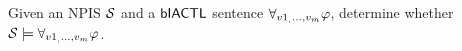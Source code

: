 \begin{definition}
  Given an NPIS $\mathcal{S}$ and a $\sf{bIACTL}$ sentence $\forall_{v1_,\ldots,v_m} \varphi$, determine whether
  $\mathcal{S} \models \forall_{v1_,\ldots,v_m} \varphi$.
\end{definition}

  







